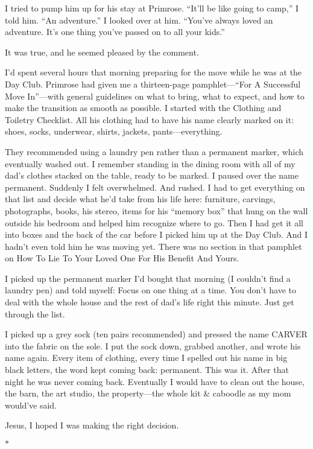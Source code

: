 \documentclass[12pt]{book}
\begin{document}
I tried to pump him up for his stay at Primrose. ``It'll be like going to camp,'' I told him. ``An adventure.'' I looked over at him. ``You've always loved an adventure. It's one thing you've passed on to all your kids.''

It was true, and he seemed pleased by the comment.

I'd spent several hours that morning preparing for the move while he was at the Day Club. Primrose had given me a thirteen-page pamphlet---``For A Successful Move In''---with general guidelines on what to bring, what to expect, and how to make the transition as smooth as possible. I started with the Clothing and Toiletry Checklist. All his clothing had to have his name clearly marked on it: shoes, socks, underwear, shirts, jackets, pants---everything.

They recommended using a laundry pen rather than a permanent marker, which eventually washed out. I remember standing in the dining room with all of my dad's clothes stacked on the table, ready to be marked. I paused over the name permanent. Suddenly I felt overwhelmed. And rushed. I had to get everything on that list and decide what he'd take from his life here: furniture, carvings, photographs, books, his stereo, items for his ``memory box'' that hung on the wall outside his bedroom and helped him recognize where to go. Then I had get it all into boxes and the back of the car before I picked him up at the Day Club. And I hadn't even told him he was moving yet. There was no section in that pamphlet on How To Lie To Your Loved One For His Benefit And Yours.

I picked up the permanent marker I'd bought that morning (I couldn't find a laundry pen) and told myself: Focus on one thing at a time. You don't have to deal with the whole house and the rest of dad's life right this minute. Just get through the list.

I picked up a grey sock (ten pairs recommended) and pressed the name CARVER into the fabric on the sole. I put the sock down, grabbed another, and wrote his name again. Every item of clothing, every time I spelled out his name in big black letters, the word kept coming back: permanent. This was it. After that night he was never coming back. Eventually I would have to clean out the house, the barn, the art studio, the property---the whole kit \& caboodle as my mom would've said.

Jesus, I hoped I was making the right decision.

\begin{center}$*$\end{center}
\end{document}
